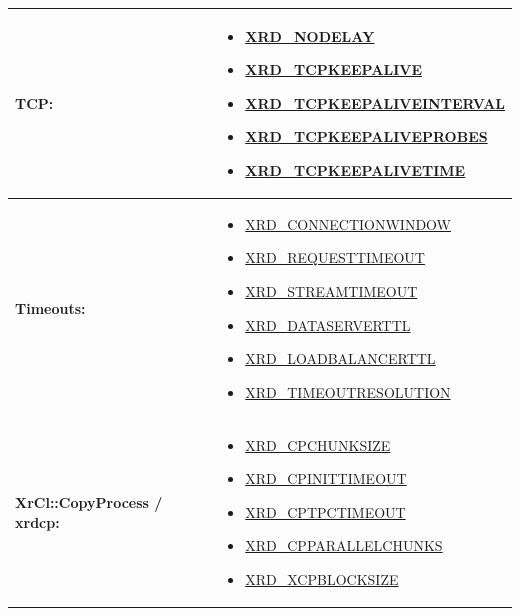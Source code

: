 \documentclass{article}
\begin{document}
\begin{center}
\begin{longtable}{ | l | p{} | }
		     {\footnotesize \textbf{TCP:}} & \begin{scriptsize} 
		     \begin{itemize}
		       \item \hyperref[env:nodelay]{XRD_NODELAY}
		       \item \hyperref[env:tcpkeepalive]{XRD_TCPKEEPALIVE}
		       \item \hyperref[env:tcpkeepaliveinterval]{XRD_TCPKEEPALIVEINTERVAL}
		       \item \hyperref[env:tcpkeepaliveprobes]{XRD_TCPKEEPALIVEPROBES}
		       \item \hyperref[env:tcpkeepalivetime]{XRD_TCPKEEPALIVETIME}
		     \end{itemize} 
		     \end{scriptsize} \\ 
		     \hline
		     
		     {\footnotesize \textbf{Timeouts:}} & \begin{scriptsize} 
		     \begin{itemize}
		       \item \hyperref[env:connectionwindow]{XRD_CONNECTIONWINDOW}
		       \item \hyperref[env:requesttimeout]{XRD_REQUESTTIMEOUT}
		       \item \hyperref[env:streamtimeout]{XRD_STREAMTIMEOUT}
		       \item \hyperref[env:dataserverttl]{XRD_DATASERVERTTL}
		       \item \hyperref[env:loadbalancerttl]{XRD_LOADBALANCERTTL}
		       \item \hyperref[env:timeoutresolution]{XRD_TIMEOUTRESOLUTION}
		     \end{itemize} 
		     \end{scriptsize} \\ 
		     \hline
		     
		     {\footnotesize \textbf{XrCl::CopyProcess / xrdcp:}} & \begin{scriptsize} 
		     \begin{itemize}
		       \item \hyperref[env:cpchunksize]{XRD_CPCHUNKSIZE}
		       \item \hyperref[env:cpinittimeout]{XRD_CPINITTIMEOUT}
		       \item \hyperref[env:cptpctimeout]{XRD_CPTPCTIMEOUT}
		       \item \hyperref[env:cpparallelchunks]{XRD_CPPARALLELCHUNKS}
		       \item \hyperref[env:xcpblocksize]{XRD_XCPBLOCKSIZE}
		     \end{itemize} 
		     \end{scriptsize} \\
		     \hline
		     

\end{longtable}
\end{center}
\end{document}
